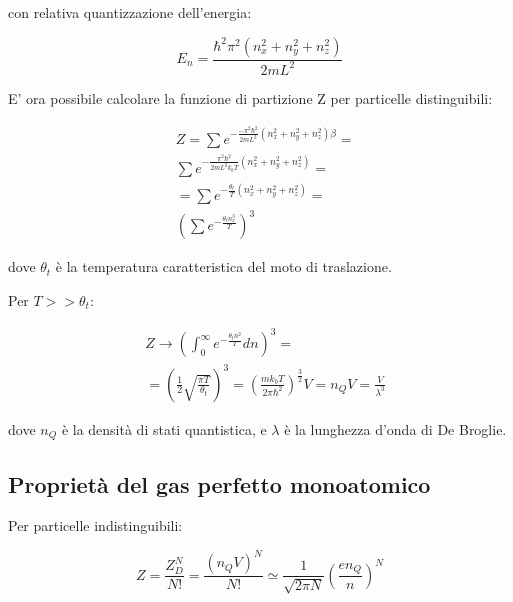 \documentclass{article}
\begin{document}
con relativa quantizzazione dell'energia:

\begin{equation}
    E_n=\frac{\hbar^2\pi^2(n_x^2+n_y^2+n_z^2)}{2mL^2}
\end{equation}

E' ora possibile calcolare la funzione di partizione Z per particelle distinguibili:

\begin{equation}
    \begin{aligned}
         & Z=\sum e^{-\frac{-\pi^2\hbar^2}{2mL^2}(n_x^2+n_y^2+n_z^2)\beta}= \\
         & \sum e^{-\frac{\pi^2\hbar^2}{2mL^2k_bT}(n_x^2+n_y^2+n_z^2)}=     \\
         & =\sum e^{-\frac{\theta_t}{T}(n_x^2+n_y^2+n_z^2)}=                \\
         & \left(\sum e^{-\frac{\theta_tn_x^3}{T}}\right)^3
    \end{aligned}
\end{equation}

dove $\theta_t$ è la temperatura caratteristica del moto di traslazione.

Per $T>>\theta_t$:

\begin{equation}
    \begin{aligned}
         & Z \rightarrow \left(\int_{0}^{\infty} e^{-\frac{\theta_tn^2}{T}}dn\right)^3=                                                               \\
         & =\left(\frac{1}{2}\sqrt{\frac{\pi T}{\theta_t}}\right)^3= \left(\frac{mk_bT}{2\pi\hbar^2}\right)^{\frac{3}{2}}V= n_QV= \frac{V}{\lambda^3}
    \end{aligned}
\end{equation}

dove $n_Q$ è la densità di stati quantistica, e $\lambda$ è la lunghezza d'onda di De Broglie.

\subsection{Proprietà del gas perfetto monoatomico}

Per particelle indistinguibili:

\begin{equation}
    Z=\frac{Z_D^N}{N!}=\frac{(n_QV)^N}{N!}\simeq \frac{1}{\sqrt{2\pi N}}\left(\frac{en_Q}{n}\right)^N
\end{equation}
\end{document}
